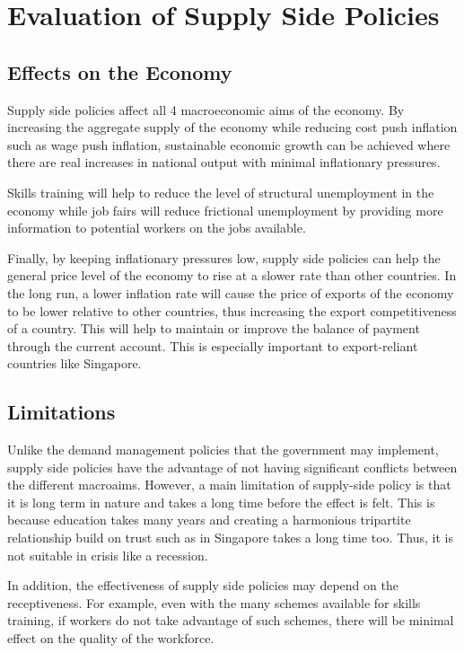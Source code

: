\section{Evaluation of Supply Side Policies}
\subsection{Effects on the Economy}
Supply side policies affect all 4 macroeconomic aims of the economy. By increasing the aggregate supply of the economy while reducing cost push inflation such as wage push inflation, sustainable economic growth can be achieved where there are real increases in national output with minimal inflationary pressures.

Skills training will help to reduce the level of structural unemployment in the economy while job fairs will reduce frictional unemployment by providing more information to potential workers on the jobs available.

Finally, by keeping inflationary pressures low, supply side policies can help the general price level of the economy to rise at a slower rate than other countries. In the long run, a lower inflation rate will cause the price of exports of the economy to be lower relative to other countries, thus increasing the export competitiveness of a country. This will help to maintain or improve the balance of payment through the current account. This is especially important to export-reliant countries like Singapore.
\subsection{Limitations}
Unlike the demand management policies that the government may implement, supply side policies have the advantage of not having significant conflicts between the different macroaims. However, a main limitation of supply-side policy is that it is long term in nature and takes a long time before the effect is felt. This is because education takes many years and creating a harmonious tripartite relationship build on trust such as in Singapore takes a long time too. Thus, it is not suitable in crisis like a recession.

In addition, the effectiveness of supply side policies may depend on the receptiveness. For example, even with the many schemes available for skills training, if workers do not take advantage of such schemes, there will be minimal effect on the quality of the workforce.

